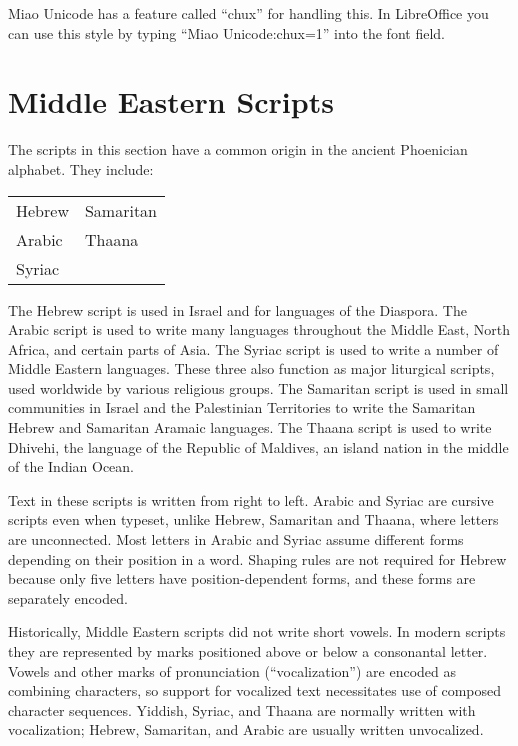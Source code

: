 Miao Unicode has a feature called “chux” for handling this. In LibreOffice you can use this style by typing “Miao Unicode:chux=1” into the font field.

\egroup








\section{Middle Eastern Scripts}

The scripts in this section have a common origin in the ancient Phoenician alphabet. They include:

\begin{center}
\begin{tabular}{ll}
Hebrew & Samaritan\\
Arabic & Thaana\\
Syriac &\\
\end{tabular}
\end{center}

The Hebrew script is used in Israel and for languages of the Diaspora. The Arabic script is
used to write many languages throughout the Middle East, North Africa, and certain parts
of Asia. The Syriac script is used to write a number of Middle Eastern languages. These
three also function as major liturgical scripts, used worldwide by various religious groups.
The Samaritan script is used in small communities in Israel and the Palestinian Territories
to write the Samaritan Hebrew and Samaritan Aramaic languages. The Thaana script is
used to write Dhivehi, the language of the Republic of Maldives, an island nation in the
middle of the Indian Ocean. 

Text in these scripts is written from right to left. Arabic and Syriac are cursive scripts even when typeset, unlike Hebrew, Samaritan  and Thaana, where letters are unconnected. Most letters in Arabic and Syriac assume different forms depending on their position in a word. Shaping rules are not required for Hebrew because only five letters have position-dependent forms, and these forms are separately encoded.

Historically, Middle Eastern  scripts did not write short vowels. In modern scripts they are represented  by marks positioned above or below a consonantal letter. Vowels and other
marks of pronunciation (“vocalization”) are encoded as combining characters, so support
for vocalized text necessitates use of composed character sequences. Yiddish, Syriac, and
Thaana are normally written with vocalization; Hebrew, Samaritan, and Arabic are usually written unvocalized. 


















